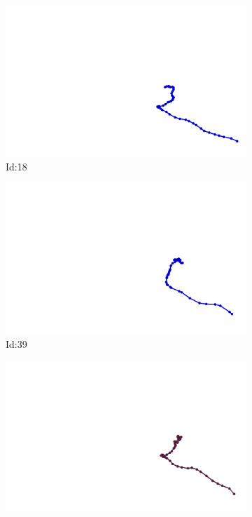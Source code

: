 \documentclass[12pt,twoside]{report}
\begin{document}
\begin{figure}
\centering
\begin{subfigure}[b]{0.20\textwidth}
\centering
\includegraphics[width=\textwidth]{../../trajectories/18.png}
\caption{Id:18}
\end{subfigure}
\begin{subfigure}[b]{0.20\textwidth}
\centering
\includegraphics[width=\textwidth]{../../trajectories/39.png}
\caption{Id:39}
\end{subfigure}
\begin{subfigure}[b]{0.20\textwidth}
\centering
\includegraphics[width=\textwidth]{../../trajectories/64.png}

\end{subfigure}
\end{figure}
\end{document}
